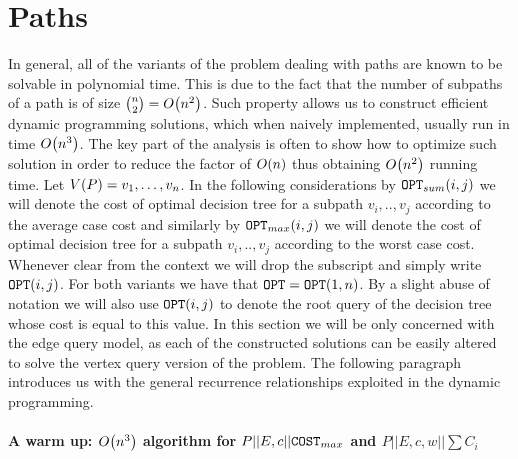 \section{Paths}
In general, all of the variants of the problem dealing with paths are known to be solvable in polynomial time. This is due to the fact that the number of subpaths of a path is of size $\binom{n}{2}=O\mathopen{}\left( n^2 \right)$. Such property allows us to construct efficient dynamic programming solutions, which when naively implemented, usually run in time $O\mathopen{}\left( n^3 \right)$. The key part of the analysis is often to show how to optimize such solution in order to reduce the factor of $O\mathopen{}\left( n \right)$ thus obtaining $O\mathopen{}\left( n^2 \right)$ running time.
Let $V\mathopen{}\left( P \right)=v_1,\dots,v_n$. In the following considerations by  $\texttt{OPT}_{sum}\mathopen{}\left( i,j \right)$ we will denote the cost of optimal decision tree for a subpath $v_i,..,v_j$ according to the average case cost and similarly by $\texttt{OPT}_{max}\mathopen{}\left( i,j \right)$ we will denote the cost of optimal decision tree for a subpath $v_i,..,v_j$ according to the worst case cost. Whenever clear from the context we will drop the subscript and simply write $\texttt{OPT}\mathopen{}\left( i,j \right)$. For both variants we have that $\texttt{OPT}=\texttt{OPT}\mathopen{}\left( 1,n \right)$. By a slight abuse of notation we will also use $\texttt{OPT}\mathopen{}\left( i,j \right)$ to denote the root query of the decision tree whose cost is equal to this value.
In this section we will be only concerned with the edge query model, as each of the constructed solutions can be easily altered to solve the vertex query version of the problem. The following paragraph introduces us with the general recurrence relationships exploited in the dynamic programming. 
\paragraph{A warm up: $O\mathopen{}\left( n^3 \right)$ algorithm for $P||E,c|| \texttt{COST}_{max}$ and $P||E,c, w|| \sum C_i$}

